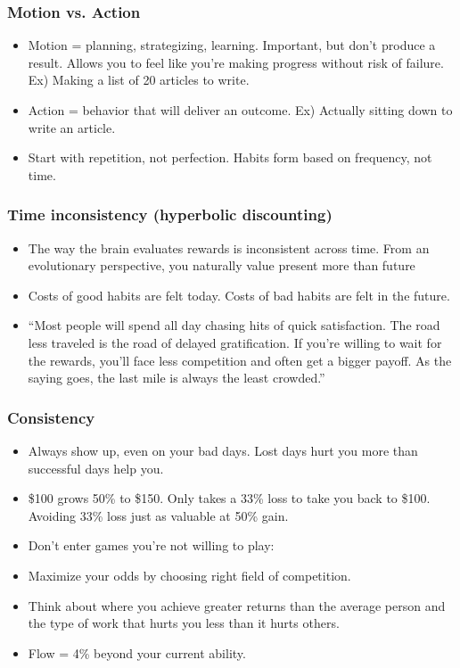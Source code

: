 \begin{frame}[fragile]\frametitle{Motion vs. Action}
\begin{itemize}
\item Motion = planning, strategizing, learning. Important, but don’t produce a result. Allows you to feel like you’re making progress without risk of failure. Ex) Making a list of 20 articles to write. 
\item Action = behavior that will deliver an outcome. Ex) Actually sitting down to write an article. 
\item Start with repetition, not perfection. Habits form based on frequency, not time. 
\end{itemize}
\end{frame}



\begin{frame}[fragile]\frametitle{Time inconsistency (hyperbolic discounting)}
\begin{itemize}
\item The way the brain evaluates rewards is inconsistent across time. From an evolutionary perspective, you naturally value present more than future 
\item Costs of good habits are felt today. Costs of bad habits are felt in the future. 
\item 
``Most people will spend all day chasing hits of quick satisfaction. The road less traveled is the road of delayed gratification. If you’re willing to wait for the rewards, you’ll face less competition and often get a bigger payoff. As the saying goes, the last mile is always the least crowded.'' 
\end{itemize}
\end{frame}

\begin{frame}[fragile]\frametitle{Consistency}
\begin{itemize}
\item Always show up, even on your bad days. Lost days hurt you more than successful days help you. 
\item \$100 grows 50\% to \$150. Only takes a 33\% loss to take you back to \$100. Avoiding 33\% loss just as valuable at 50\% gain.  
\item Don't enter games you're not willing to play:
\item Maximize your odds by choosing right field of competition.  
\item Think about where you achieve greater returns than the average person and the type of work that hurts you less than it hurts others.  
\item Flow = 4\% beyond your current ability. 
\end{itemize}
\end{frame}

